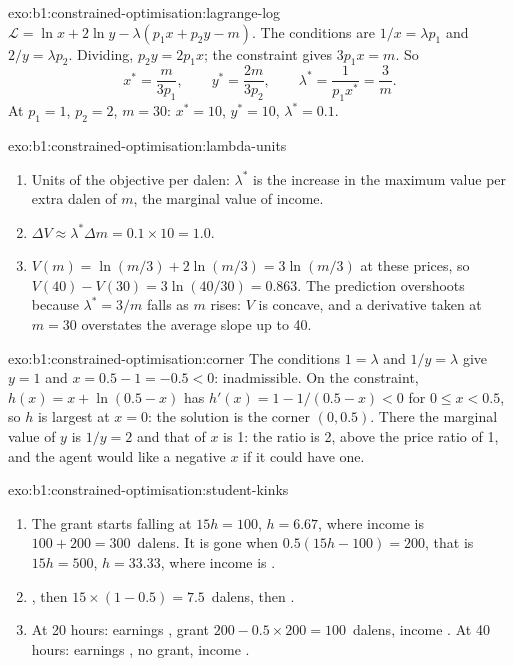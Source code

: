 \begin{solution}{exo:b1:constrained-optimisation:lagrange-log}
$\mathcal L = \ln x + 2\ln y - \lambda(p_1x + p_2y - m)$. The conditions are
$1/x = \lambda p_1$ and $2/y = \lambda p_2$. Dividing, $p_2 y = 2p_1 x$; the
constraint gives $3p_1x = m$. So
\[
x^* = \frac{m}{3p_1}, \qquad y^* = \frac{2m}{3p_2}, \qquad \lambda^* = \frac{1}{p_1 x^*} = \frac{3}{m}.
\]
At $p_1 = 1$, $p_2 = 2$, $m = 30$: $x^* = 10$, $y^* = 10$, $\lambda^* = 0.1$.
\end{solution}

\begin{solution}{exo:b1:constrained-optimisation:lambda-units}
\begin{enumerate}
  \item Units of the objective per dalen: $\lambda^*$ is the increase in the
    maximum value per extra dalen of $m$, the marginal value of income.
  \item $\Delta V \approx \lambda^* \Delta m = 0.1 \times 10 = 1.0$.
  \item $V(m) = \ln(m/3) + 2\ln(m/3) = 3\ln(m/3)$ at these prices, so
    $V(40) - V(30) = 3\ln(40/30) = 0.863$. The prediction overshoots because
    $\lambda^* = 3/m$ falls as $m$ rises: $V$ is concave, and a derivative
    taken at $m = 30$ overstates the average slope up to 40.
\end{enumerate}
\end{solution}

\begin{solution}{exo:b1:constrained-optimisation:corner}
The conditions $1 = \lambda$ and $1/y = \lambda$ give $y = 1$ and
$x = 0.5 - 1 = -0.5 < 0$: inadmissible. On the constraint,
$h(x) = x + \ln(0.5 - x)$ has $h'(x) = 1 - 1/(0.5 - x) < 0$ for
$0 \le x < 0.5$, so $h$ is largest at $x = 0$: the solution is the corner
$(0, 0.5)$. There the marginal value of $y$ is $1/y = 2$ and that of $x$ is
1: the ratio is 2, above the price ratio of 1, and the agent would like a
negative $x$ if it could have one.
\end{solution}

\begin{solution}{exo:b1:constrained-optimisation:student-kinks}
\begin{enumerate}
  \item The grant starts falling at $15h = 100$, $h = 6.67$, where income is
    $100 + 200 = \num{300}$~dalens. It is gone when $0.5(15h - 100) = 200$, that is
    $15h = 500$, $h = 33.33$, where income is .
  \item {}, then $15 \times (1 - 0.5) = \num{7.5}$~dalens, then .
  \item At 20 hours: earnings , grant $200 - 0.5 \times 200 = \num{100}$~dalens,
    income . At 40 hours: earnings , no grant, income .
\end{enumerate}
\end{solution}

